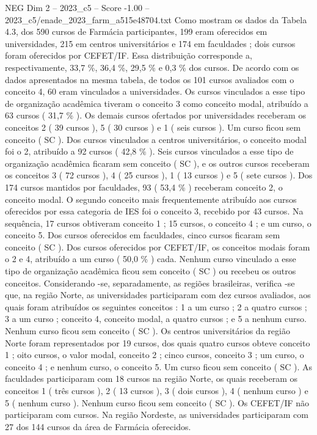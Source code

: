 \begin{textsample}{NEG Dim 2 – 2023\_c5 – Score -1.00 – 2023\_c5/enade\_2023\_farm\_a515e48704.txt}
Como mostram os dados da Tabela 4.3, dos 590 cursos de Farmácia participantes, 199 eram oferecidos em universidades, 215 em centros universitários e 174 em faculdades ; dois cursos foram oferecidos por CEFET/IF.
Essa distribuição corresponde a, respectivamente, 33,7 \%, 36,4 \%, 29,5 \% e 0,3 \% dos cursos.
De acordo com os dados apresentados na mesma tabela, de todos os 101 cursos avaliados com o conceito 4, 60 eram vinculados a universidades.
Os cursos vinculados a esse tipo de organização acadêmica tiveram o conceito 3 como conceito modal, atribuído a 63 cursos ( 31,7 \% ).
Os demais cursos ofertados por universidades receberam os conceitos 2 ( 39 cursos ), 5 ( 30 cursos ) e 1 ( seis cursos ).
Um curso ficou sem conceito ( SC ).
Dos cursos vinculados a centros universitários, o conceito modal foi o 2, atribuído a 92 cursos ( 42,8 \% ).
Seis cursos vinculados a esse tipo de organização acadêmica ficaram sem conceito ( SC ), e os outros cursos receberam os conceitos 3 ( 72 cursos ), 4 ( 25 cursos ), 1 ( 13 cursos ) e 5 ( sete cursos ).
Dos 174 cursos mantidos por faculdades, 93 ( 53,4 \% ) receberam conceito 2, o conceito modal.
O segundo conceito mais frequentemente atribuído aos cursos oferecidos por essa categoria de IES foi o conceito 3, recebido por 43 cursos.
Na sequência, 17 cursos obtiveram conceito 1 ; 15 cursos, o conceito 4 ; e um curso, o conceito 5.
Dos cursos oferecidos em faculdades, cinco cursos ficaram sem conceito ( SC ).
Dos cursos oferecidos por CEFET/IF, os conceitos modais foram o 2 e 4, atribuído a um curso ( 50,0 \% ) cada.
Nenhum curso vinculado a esse tipo de organização acadêmica ficou sem conceito ( SC ) ou recebeu os outros conceitos.
Considerando -se, separadamente, as regiões brasileiras, verifica -se que, na região Norte, as universidades participaram com dez cursos avaliados, aos quais foram atribuídos os seguintes conceitos : 1 a um curso ; 2 a quatro cursos ; 3 a um curso ; conceito 4, conceito modal, a quatro cursos ; e 5 a nenhum curso.
Nenhum curso ficou sem conceito ( SC ).
Os centros universitários da região Norte foram representados por 19 cursos, dos quais quatro cursos obteve conceito 1 ; oito cursos, o valor modal, conceito 2 ; cinco cursos, conceito 3 ; um curso, o conceito 4 ; e nenhum curso, o conceito 5.
Um curso ficou sem conceito ( SC ).
As faculdades participaram com 18 cursos na região Norte, os quais receberam os conceitos 1 ( três cursos ), 2 ( 13 cursos ), 3 ( dois cursos ), 4 ( nenhum curso ) e 5 ( nenhum curso ).
Nenhum curso ficou sem conceito ( SC ).
Os CEFET/IF não participaram com cursos.
Na região Nordeste, as universidades participaram com 27 dos 144 cursos da área de Farmácia oferecidos.

\end{textsample}
